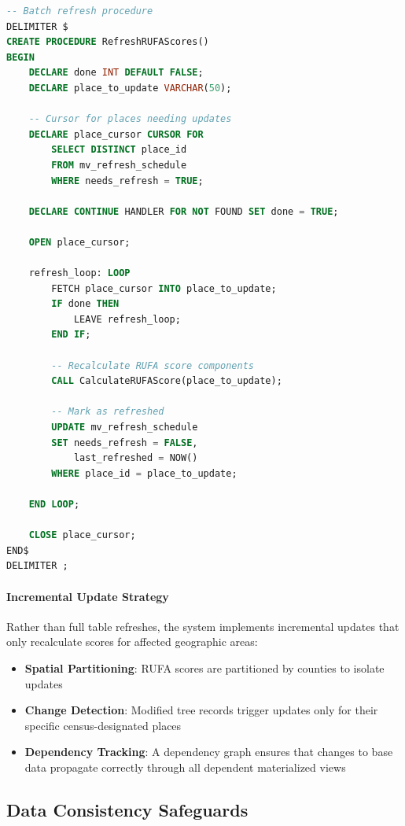 \begin{lstlisting}[language=SQL, caption=Batch refresh procedure for RUFA scores]
-- Batch refresh procedure
DELIMITER $
CREATE PROCEDURE RefreshRUFAScores()
BEGIN
    DECLARE done INT DEFAULT FALSE;
    DECLARE place_to_update VARCHAR(50);
    
    -- Cursor for places needing updates
    DECLARE place_cursor CURSOR FOR 
        SELECT DISTINCT place_id 
        FROM mv_refresh_schedule 
        WHERE needs_refresh = TRUE;
    
    DECLARE CONTINUE HANDLER FOR NOT FOUND SET done = TRUE;
    
    OPEN place_cursor;
    
    refresh_loop: LOOP
        FETCH place_cursor INTO place_to_update;
        IF done THEN
            LEAVE refresh_loop;
        END IF;
        
        -- Recalculate RUFA score components
        CALL CalculateRUFAScore(place_to_update);
        
        -- Mark as refreshed
        UPDATE mv_refresh_schedule 
        SET needs_refresh = FALSE, 
            last_refreshed = NOW()
        WHERE place_id = place_to_update;
        
    END LOOP;
    
    CLOSE place_cursor;
END$
DELIMITER ;
\end{lstlisting}

\paragraph{Incremental Update Strategy}

Rather than full table refreshes, the system implements incremental updates that only recalculate scores for affected geographic areas:

\begin{itemize}
    \item \textbf{Spatial Partitioning}: RUFA scores are partitioned by counties to isolate updates
    \item \textbf{Change Detection}: Modified tree records trigger updates only for their specific census-designated places
    \item \textbf{Dependency Tracking}: A dependency graph ensures that changes to base data propagate correctly through all dependent materialized views
\end{itemize}

\subsection{Data Consistency Safeguards}

